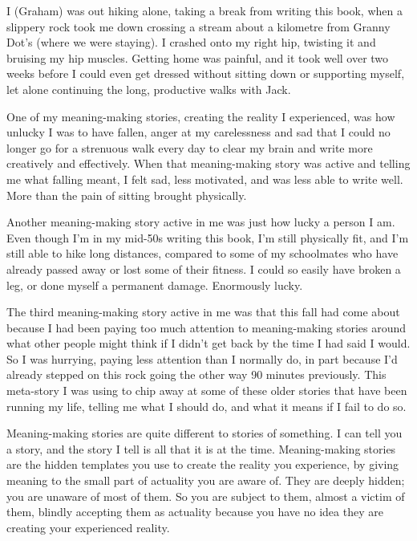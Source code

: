 \begin{longstoryblock}
I (Graham) was out hiking alone, taking a break from writing this book, when a slippery rock took me down crossing a stream about a kilometre from Granny Dot’s (where we were staying). I crashed onto my right hip, twisting it and bruising my hip muscles. Getting home was painful, and it took well over two weeks before I could even get dressed without sitting down or supporting myself, let alone continuing the long, productive walks with Jack.


One of my meaning-making stories, creating the reality I experienced, was how unlucky I was to have fallen, anger at my carelessness and sad that I could no longer go for a strenuous walk every day to clear my brain and write more creatively and effectively. When that meaning-making story was active and telling me what falling meant, I felt sad, less motivated, and was less able to write well. More than the pain of sitting brought physically.


Another meaning-making story active in me was just how lucky a person I am. Even though I'm in my mid-50s writing this book, I'm still physically fit, and I'm still able to hike long distances, compared to some of my schoolmates who have already passed away or lost some of their fitness. I could so easily have broken a leg, or done myself a permanent damage. Enormously lucky.


The third meaning-making story active in me was that this fall had come about because I had been paying too much attention to meaning-making stories around what other people might think if I didn't get back by the time I had said I would. So I was hurrying, paying less attention than I normally do, in part because I'd already stepped on this rock going the other way 90 minutes previously. This meta-story I was using to chip away at some of these older stories that have been running my life, telling me what I should do, and what it means if I fail to do so.
\end{longstoryblock}


Meaning-making stories are quite different to stories of something. I can tell you a story, and the story I tell is all that it is at the time. Meaning-making stories are the hidden templates you use to create the reality you experience, by giving meaning to the small part of actuality you are aware of. They are deeply hidden; you are unaware of most of them. So you are subject to them, almost a victim of them, blindly accepting them as actuality because you have no idea they are creating your experienced reality.


